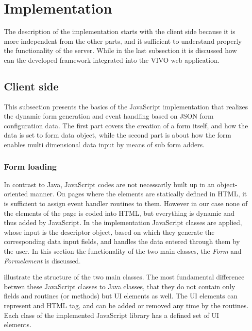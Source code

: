 
\newpage
\section{Implementation} \label{52}

The description of the implementation starts with the client side because it is more independent from the other parts, and it sufficient to understand properly the functionality of the server. While in the last subsection it is discussed how can the developed framework integrated into the VIVO web application. 


\subsection{Client side}

This subsection presents the basics of the JavaScript implementation that realizes the dynamic form generation and event handling based on JSON form configuration data. The first part covers the creation of a form itself, and how the data is set to form data object, while the second part is about how the form enables multi dimensional data input by means of sub form adders.
 

\subsubsection{Form loading}

In contrast to Java, JavaScript codes are not necessarily built up in an object-oriented manner. On pages where the elements are statically defined in HTML, it is sufficient to assign event handler routines to them. However in our case none of the elements of the page is coded into HTML, but everything is dynamic and thus added by JavaScript. In the implementation JavaScript classes are applied, whose input is the descriptor object, based on which they generate the corresponding data input fields, and handles the data entered through them by the user. In this section the functionality of the two main classes, the \textit{Form} and \textit{Formelement} is discussed.  


 illustrate the structure of the two main classes. The most fundamental difference betwen these JavaScript classes to Java classes, that they do not contain only fields and routines (or methods) but UI elements as well. The UI elements can represent and HTML tag, and can be added or removed any time by the routines. Each class of the implemented JavaScript library has a defined set of UI elements. 

